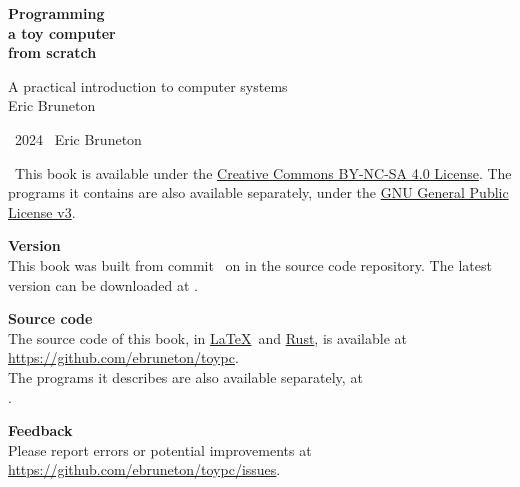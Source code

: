

\begin{titlepage}

\begin{flushleft}
\sffamily\fontsize{34}{36}\bfseries\selectfont
Programming\\
a toy computer\\
from scratch

\vspace{12cm}
\fontsize{16}{18}\selectfont
A practical introduction to computer systems\\
\vspace{1cm}
Eric Bruneton
\end{flushleft}
\end{titlepage}


\thispagestyle{empty}

\vspace*{\fill}

\begin{flushleft}
\textcopyright\ 2024 \, Eric Bruneton

\medskip

\ccbyncsa\ This book is available under the
\href{https://creativecommons.org/licenses/by-nc-sa/4.0/}{Creative Commons
BY-NC-SA 4.0 License}. The programs it contains are also available separately,
under the \href{https://www.gnu.org/licenses/gpl-3.0.en.html}{GNU General
Public License v3}.

\medskip

\textbf{Version} \\ This book was built from commit
\gitcommithash[shortHash=false]\ on \gitcommitdate[formatDate] in the source
code repository. The latest version can be downloaded at \toypcurl{}.

\medskip

\textbf{Source code} \\
The source code of this book, in \href{https://www.latex-project.org/}{\LaTeX}\
and \href{https://www.rust-lang.org/}{Rust}, is available at \\
\url{https://github.com/ebruneton/toypc}. \\
The programs it describes are also available separately, at \\
\toypcurl{}.

\medskip

\textbf{Feedback} \\
Please report errors or potential improvements at \\
\url{https://github.com/ebruneton/toypc/issues}.
\end{flushleft}

